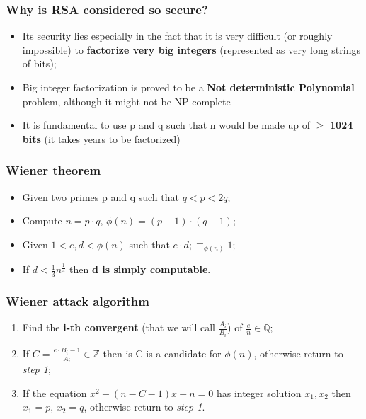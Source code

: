 \documentclass{beamer}
\begin{document}
\frame{\sectionpage}


	\begin{frame}
 		 \frametitle{Why is RSA considered so secure?}
			
			\begin{itemize}
			\item Its security lies especially in the fact that it is very difficult (or roughly impossible) to \textbf{factorize very big integers} (represented as very long strings of bits);
			\item Big integer factorization is proved to be a \textbf{Not deterministic Polynomial} problem, although it might not be NP-complete
			\item It is fundamental to use p and q such that n would be made up of $\geq$ \textbf{1024 bits} (it takes years to be factorized)
			\end{itemize}
  		\end{frame}
  		
  \begin{frame}
  \frametitle{Wiener theorem}
    \begin{itemize}
    	\item Given two primes p and q such that $q < p < 2q$;
    	\item Compute $n = p \cdot q$, $\phi(n) = (p-1) \cdot (q-1)$;
    	\item Given $1 < e,d < \phi(n)$ such that $e \cdot d; \equiv_{\phi(n)} 1$;
    	\item If $d < \frac { 1 }{ 3 } { n }^{ \frac { 1 }{ 4 }  }$ then \textbf{d is simply computable}.
    \end{itemize}
    
  \end{frame}
  
  \begin{frame}
  \frametitle{Wiener attack algorithm}
  
  \begin{enumerate}
  
  \item Find the \textbf{i-th convergent} (that we will call $\frac{A_i}{B_i}$) of $\frac { e }{ n }  \in  \mathbb{Q}$;
  \item If $C = \frac{e \cdot B_i - 1}{A_i} \in \mathbb{Z}$ then is C is a candidate for $\phi(n)$, otherwise return to \textit{step 1};
  \item If the equation ${x}^{2} - (n - C - 1)x + n = 0$ has integer solution $x_1, x_2$ then $x_1 = p$, $x_2 = q$, otherwise return to \textit{step 1}.
  
  \end{enumerate}
  
  \end{frame}
  		
\end{document}

